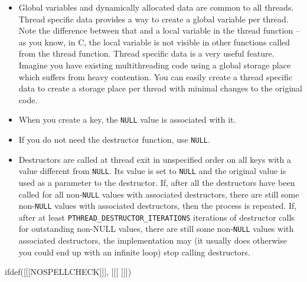 \begin{itemize}
\item {} Global variables and dynamically
allocated data are common to all threads.  Thread specific data provides a way to
create a global variable per thread.  Note the difference between that and a
local variable in the thread function -- as you know, in C, the local variable
is not visible in other functions called from the thread function.  Thread
specific data is a very useful feature.  Imagine you have existing
multithreading code using a global storage place which suffers from heavy
contention.  You can easily create a thread specific data to create a storage
place per thread with minimal changes to the original code.
\item When you create a key, the \texttt{NULL} value is associated with it.
\item If you do not need the destructor function, use \texttt{NULL}.
\item Destructors are called at thread exit in unspecified order on all keys
with a value different from \texttt{NULL}.  Its value is set to \texttt{NULL}
and the original value is used as a parameter to the destructor.  If, after
all the destructors have been called for all non-\texttt{NULL} values with
associated destructors, there are still some non-\texttt{NULL} values with
associated destructors, then the process is repeated.  If, after at least
\texttt{PTHREAD\_DESTRUCTOR\_ITERATIONS} iterations of destructor calls for
outstanding non-NULL values, there are still some non-\texttt{NULL} values with
associated destructors, the implementation may (it usually does otherwise you
could end up with an infinite loop) stop calling destructors.
\end{itemize}


ifdef([[[NOSPELLCHECK]]], [[[
]]])

